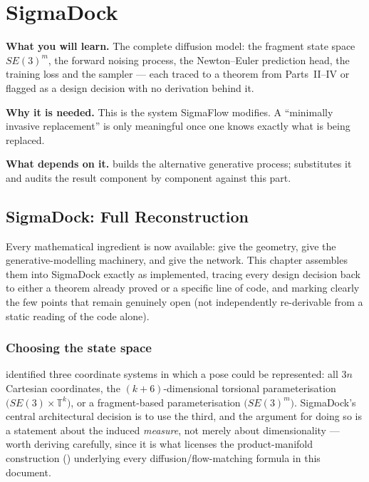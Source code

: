 \documentclass[11pt,a4paper]{report}
\theoremstyle{definition}
\theoremstyle{remark}
\begin{document}
\part{SigmaDock}
\label{part:sigmadock}


\begin{tcolorbox}[colback=gray!4,colframe=gray!55!black,
  title=Part V at a glance, fonttitle=\bfseries, breakable]
\textbf{What you will learn.} The complete diffusion model: the fragment state space $SE(3)^m$, the forward noising process, the Newton--Euler prediction head, the training loss and the sampler --- each traced to a theorem from Parts~II--IV or flagged as a design decision with no derivation behind it.

\textbf{Why it is needed.} This is the system SigmaFlow modifies. A ``minimally invasive replacement'' is only meaningful once one knows exactly what is being replaced.

\textbf{What depends on it.}  builds the alternative generative process;  substitutes it and audits the result component by component against this part.
\end{tcolorbox}


\chapter{SigmaDock: Full Reconstruction}
\label{chap:sigmadock}

Every mathematical ingredient is now available:
 give the geometry,
 give the generative-modelling
machinery, and  give the network.
This chapter assembles them into SigmaDock exactly as implemented, tracing
every design decision back to either a theorem already proved or a specific
line of code, and marking clearly the few points that remain genuinely
open (not independently re-derivable from a static reading of the code
alone).

\section{Choosing the state space}
\label{sec:sigmadock-state-space}

 identified three coordinate systems in which a pose
could be represented: all $3n$ Cartesian coordinates, the
$(k{+}6)$-dimensional torsional parameterisation
$\bigl(SE(3)\times\mathbb T^k\bigr)$, or a fragment-based parameterisation
$\bigl(SE(3)^m\bigr)$. SigmaDock's central architectural decision is to use
the third, and the argument for doing so is a statement about the induced
\emph{measure}, not merely about dimensionality --- worth deriving
carefully, since it is what licenses the product-manifold construction
() underlying every diffusion/flow-matching formula
in this document.
\end{document}
